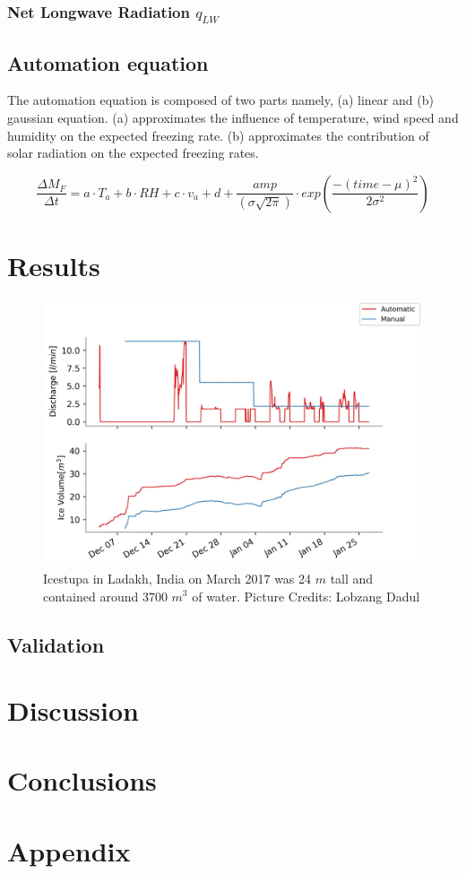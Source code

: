 \documentclass[utf8]{frontiersSCNS}
\begin{document}
\subsubsection{Net Longwave Radiation \texorpdfstring{$q_{LW}$}{Lg}} \label{sec:LW}

\subsection{Automation equation}

The automation equation is composed of two parts namely, (a) linear and (b) gaussian equation. (a)
approximates the influence of temperature, wind speed and humidity on the expected freezing rate. (b)
approximates the contribution of solar radiation on the expected freezing rates. 

\begin{equation}
	\frac{\Delta M_{F}}{\Delta t} = a \cdot T_a + b \cdot RH + c \cdot v_a + d
  +\frac{amp}{(\sigma \sqrt{2\pi})} \cdot exp\left(\frac{-(time-\mu)^2}{2\sigma^2}\right)
	\label{eqn:auto}
\end{equation}

\section{Results}

\begin{figure}
	\begin{center}
		\includegraphics[width=\linewidth]{Figures/autovsmanual.jpg}
	\end{center}
	\caption{Icestupa in Ladakh, India on March 2017 was 24 $m$ tall and contained around 3700 $m^3$
		of water. Picture Credits: Lobzang Dadul}
	\label{fig:old_icestupa}
\end{figure}

\subsection{Validation}

\section{Discussion}

\section{Conclusions}

\section{Appendix}
\end{document}
